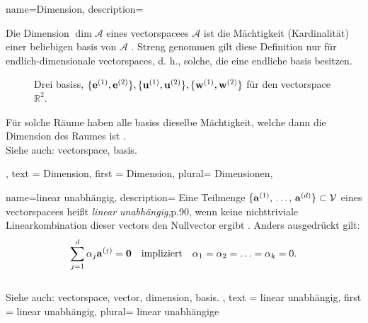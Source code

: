 {name={Dimension},
 description={
 Die Dimension \(\dim \mathcal{A}\) eines \gls{vectorspace}es \(\mathcal{A}\) ist die Mächtigkeit (Kardinalität) einer beliebigen \gls{basis} von \(\mathcal{A}\) \cite{Axler2025}. 
 Streng genommen gilt diese Definition nur für endlich-dimensionale \glspl{vectorspace}, d. h., solche, die eine endliche \gls{basis} besitzen. 
 \begin{figure}[H]
  \caption{Drei \glspl{basis}, \(\{{\bf e}^{(1)},{\bf e}^{(2)}\}, \{{\bf u}^{(1)},{\bf u}^{(2)}\}, \{{\bf w}^{(1)},{\bf w}^{(2)}\}\) für den \gls{vectorspace} \(\mathbb R^2\).}
 \end{figure}
 Für solche Räume haben alle \glspl{basis} dieselbe Mächtigkeit, welche dann die Dimension des Raumes ist \cite[Kap. 2]{Axler2025}.\\
 Siehe auch: \gls{vectorspace}, \gls{basis}.
 },
 text = {Dimension},
 first = {Dimension},
 plural= {Dimensionen},
}

{name={linear unabhängig},
 description={
 Eine Teilmenge $\{{\bf a}^{(1)}, \,\ldots, \,{\bf a}^{(d)}\} \subset \mathcal{V}$ 
 eines \gls{vectorspace}es heißt \emph{linear unabhängig}\cite{Thomas2013LineareAlgebra}{,p.90}, 
 wenn keine nichttriviale Linearkombination dieser \glspl{vector} 
 den Null\gls{vector} ergibt \cite{StrangLinAlg2016}. 
 Anders ausgedrückt gilt:
 \[
 \sum_{j=1}^{d} \alpha_{j} {\bf a}^{(j)} = \mathbf{0}	
 \quad \text{impliziert} \quad \alpha_{1} = \alpha_{2} = \ldots = \alpha_{k} = 0.
 \]
 \\[0.5em]
 Siehe auch: \gls{vectorspace}, \gls{vector}, \gls{dimension}, \gls{basis}.
 },
 text = {linear unabhängig},
 first = {linear unabhängig},
 plural= {linear unabhängige}
}



